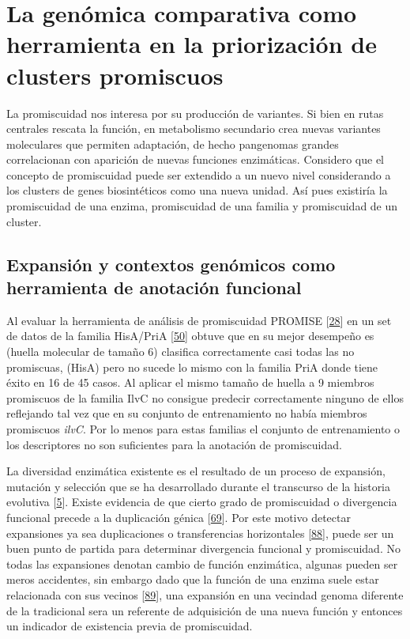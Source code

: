 \documentclass[12pt,twoside]{reedthesis}
\begin{document}
  \section{La genómica comparativa como herramienta en la priorización de
  clusters
  promiscuos}\label{la-genomica-comparativa-como-herramienta-en-la-priorizacion-de-clusters-promiscuos}
  
  La promiscuidad nos interesa por su producción de variantes. Si bien en
  rutas centrales rescata la función, en metabolismo secundario crea
  nuevas variantes moleculares que permiten adaptación, de hecho
  pangenomas grandes correlacionan con aparición de nuevas funciones
  enzimáticas. Considero que el concepto de promiscuidad puede ser
  extendido a un nuevo nivel considerando a los clusters de genes
  biosintéticos como una nueva unidad. Así pues existiría la promiscuidad
  de una enzima, promiscuidad de una familia y promiscuidad de un cluster.
  
  \subsection{Expansión y contextos genómicos como herramienta de
  anotación
  funcional}\label{expansion-y-contextos-genomicos-como-herramienta-de-anotacion-funcional}
  
  Al evaluar la herramienta de análisis de promiscuidad PROMISE
  {[}\protect\hyperlink{ref-carbonell_molecular_2010}{28}{]} en un set de
  datos de la familia HisA/PriA
  {[}\protect\hyperlink{ref-noda-garcia_insights_2015}{50}{]} obtuve que
  en su mejor desempeño es (huella molecular de tamaño 6) clasifica
  correctamente casi todas las no promiscuas, (HisA) pero no sucede lo
  mismo con la familia PriA donde tiene éxito en 16 de 45 casos. Al
  aplicar el mismo tamaño de huella a 9 miembros promiscuos de la familia
  IlvC no consigue predecir correctamente ninguno de ellos reflejando tal
  vez que en su conjunto de entrenamiento no había miembros promiscuos
  \emph{ilvC}. Por lo menos para estas familias el conjunto de
  entrenamiento o los descriptores no son suficientes para la anotación de
  promiscuidad.
  
  La diversidad enzimática existente es el resultado de un proceso de
  expansión, mutación y selección que se ha desarrollado durante el
  transcurso de la historia evolutiva
  {[}\protect\hyperlink{ref-khersonsky_enzyme_2010}{5}{]}. Existe
  evidencia de que cierto grado de promiscuidad o divergencia funcional
  precede a la duplicación génica
  {[}\protect\hyperlink{ref-hughes_evolution_1994}{69}{]}. Por este motivo
  detectar expansiones ya sea duplicaciones o transferencias horizontales
  {[}\protect\hyperlink{ref-treangen_horizontal_2011}{88}{]}, puede ser un
  buen punto de partida para determinar divergencia funcional y
  promiscuidad. No todas las expansiones denotan cambio de función
  enzimática, algunas pueden ser meros accidentes, sin embargo dado que la
  función de una enzima suele estar relacionada con sus vecinos
  {[}\protect\hyperlink{ref-overbeek_use_1999}{89}{]}, una expansión en
  una vecindad genoma diferente de la tradicional sera un referente de
  adquisición de una nueva función y entonces un indicador de existencia
  previa de promiscuidad.
  
\end{document}
